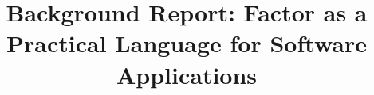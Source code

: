 \documentclass{sig-alternate}
\begin{document}
 \sloppy

%

\title{Background Report:  Factor as a Practical Language for Software Applications}
%
%
%
%
%
\end{document}

